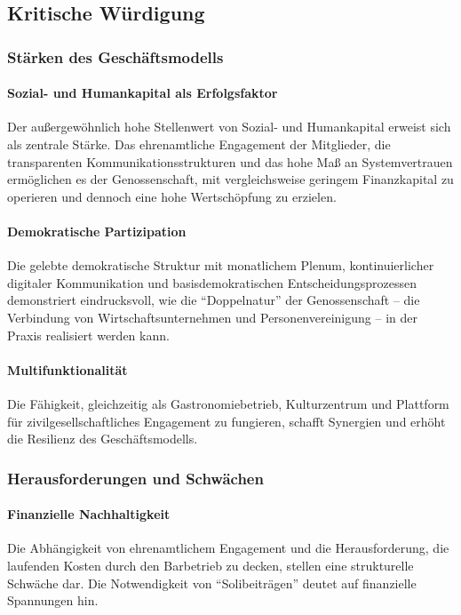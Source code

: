 \subsection{Kritische Würdigung}

\subsubsection{Stärken des Geschäftsmodells}

\paragraph{Sozial- und Humankapital als Erfolgsfaktor}
Der außergewöhnlich hohe Stellenwert von Sozial- und Humankapital erweist sich als zentrale Stärke. Das ehrenamtliche Engagement der Mitglieder, die transparenten Kommunikationsstrukturen und das hohe Maß an Systemvertrauen ermöglichen es der Genossenschaft, mit vergleichsweise geringem Finanzkapital zu operieren und dennoch eine hohe Wertschöpfung zu erzielen.

\paragraph{Demokratische Partizipation}
Die gelebte demokratische Struktur mit monatlichem Plenum, kontinuierlicher digitaler Kommunikation und basisdemokratischen Entscheidungsprozessen demonstriert eindrucksvoll, wie die \enquote{Doppelnatur} der Genossenschaft – die Verbindung von Wirtschaftsunternehmen und Personenvereinigung – in der Praxis realisiert werden kann.

\paragraph{Multifunktionalität}
Die Fähigkeit, gleichzeitig als Gastronomiebetrieb, Kulturzentrum und Plattform für zivilgesellschaftliches Engagement zu fungieren, schafft Synergien und erhöht die Resilienz des Geschäftsmodells.

\subsubsection{Herausforderungen und Schwächen}

\paragraph{Finanzielle Nachhaltigkeit}
Die Abhängigkeit von ehrenamtlichem Engagement und die Herausforderung, die laufenden Kosten durch den Barbetrieb zu decken, stellen eine strukturelle Schwäche dar. Die Notwendigkeit von \enquote{Solibeiträgen} deutet auf finanzielle Spannungen hin.

